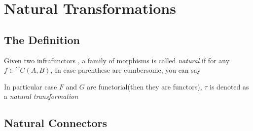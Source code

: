 \section{Natural Transformations}

\subsection{The Definition}

\begin{definition}[Naturality]
Given two infrafunctors
, a family of morphisms
is called \emph{natural} if for any $f \in \cat{C}(A,B)$,
In case parenthese are cumbersome, you can say
\end{definition}
\begin{definition}
In particular case $F$ and $G$ are functorial(then they are functors), $\tau$ is denoted as a \emph{natural transformation}
\end{definition}

\subsection{Natural Connectors}

